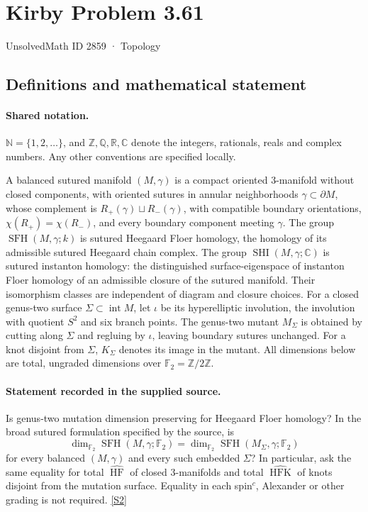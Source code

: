 \documentclass[11pt]{article}
\newcommand{\sref}[2]{\hyperlink{source:#1:#2}{[S#2]}}
\begin{document}
\setcounter{section}{2858}
\section{Kirby Problem 3.61}\label{2859}
{\small\sffamily UnsolvedMath ID 2859 · Topology}
\subsection{Definitions and mathematical statement}

\paragraph{Shared notation.}$\mathbb N=\{1,2,\ldots\}$, and $\mathbb Z,\mathbb Q,\mathbb R,\mathbb C$ denote the integers, rationals, reals and complex numbers. Any other conventions are specified locally.


A balanced sutured manifold $(M,\gamma)$ is a compact oriented $3$-manifold without closed components, with oriented sutures in annular neighborhoods $\gamma\subset\partial M$, whose complement is $R_+(\gamma)\sqcup R_-(\gamma)$, with compatible boundary orientations, $\chi(R_+)=\chi(R_-)$, and every boundary component meeting $\gamma$. The group $\operatorname{SFH}(M,\gamma;k)$ is sutured Heegaard Floer homology, the homology of its admissible sutured Heegaard chain complex. The group $\operatorname{SHI}(M,\gamma;\mathbb C)$ is sutured instanton homology: the distinguished surface-eigenspace of instanton Floer homology of an admissible closure of the sutured manifold. Their isomorphism classes are independent of diagram and closure choices. For a closed genus-two surface $\Sigma\subset\operatorname{int}M$, let $\iota$ be its hyperelliptic involution, the involution with quotient $S^2$ and six branch points. The genus-two mutant $M_\Sigma$ is obtained by cutting along $\Sigma$ and regluing by $\iota$, leaving boundary sutures unchanged. For a knot disjoint from $\Sigma$, $K_\Sigma$ denotes its image in the mutant. All dimensions below are total, ungraded dimensions over $\mathbb F_2=\mathbb Z/2\mathbb Z$.
\paragraph{Statement recorded in the supplied source.}
Is genus-two mutation dimension preserving for Heegaard Floer homology? In the broad sutured formulation specified by the source, is
\[
\dim_{\mathbb F_2}\operatorname{SFH}(M,\gamma;\mathbb F_2)
=\dim_{\mathbb F_2}\operatorname{SFH}(M_\Sigma,\gamma;\mathbb F_2)
\]
for every balanced $(M,\gamma)$ and every such embedded $\Sigma$? In particular, ask the same equality for total $\widehat{\operatorname{HF}}$ of closed $3$-manifolds and total $\widehat{\operatorname{HFK}}$ of knots disjoint from the mutation surface. Equality in each spin$^c$, Alexander or other grading is not required. \sref{2859}{2}
\end{document}
